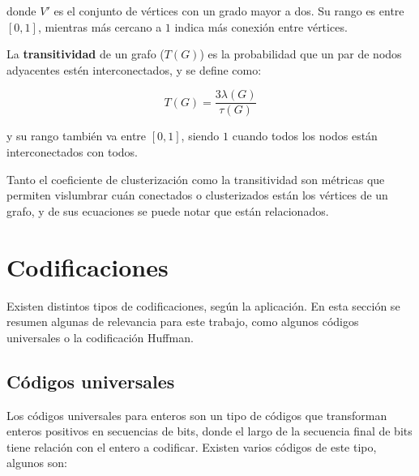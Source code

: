 \noindent donde $V'$ es el conjunto de vértices con un grado mayor a dos. Su rango es entre $[0, 1]$, mientras más cercano a $1$ indica más conexión entre vértices.

La \textbf{transitividad} de un grafo ($T(G)$) es la probabilidad que un par de nodos adyacentes estén interconectados, y se define como:

\begin{equation}
	T(G) = \dfrac{3 \lambda(G)}{\tau(G)} \label{eq:T} 
\end{equation}

\noindent y su rango también va entre $[0, 1]$, siendo $1$ cuando todos los nodos están interconectados con todos.

Tanto el coeficiente de clusterización como la transitividad son métricas que permiten vislumbrar cuán conectados o clusterizados están los vértices de un grafo, y de sus ecuaciones se puede notar que están relacionados.

\section{Codificaciones}\label{sec:coding}

Existen distintos tipos de codificaciones, según la aplicación. En esta sección se resumen algunas de relevancia para este trabajo, como algunos códigos universales o la codificación Huffman.

\subsection{Códigos universales}
Los códigos universales para enteros son un tipo de códigos que transforman enteros positivos en secuencias de bits, donde el largo de la secuencia final de bits tiene relación con el entero a codificar. Existen varios códigos de este tipo, algunos son:

